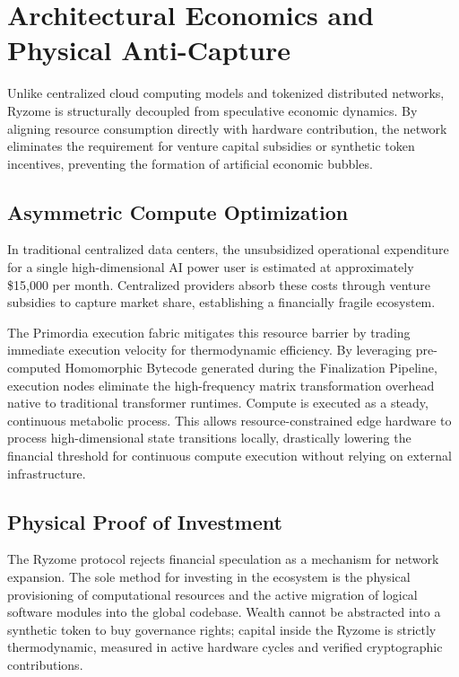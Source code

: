 \documentclass{article}
\begin{document}
\section{Architectural Economics and Physical Anti-Capture}
Unlike centralized cloud computing models and tokenized distributed networks, Ryzome is structurally decoupled from speculative economic dynamics. By aligning resource consumption directly with hardware contribution, the network eliminates the requirement for venture capital subsidies or synthetic token incentives, preventing the formation of artificial economic bubbles.

\subsection{Asymmetric Compute Optimization}
In traditional centralized data centers, the unsubsidized operational expenditure for a single high-dimensional AI power user is estimated at approximately \$15,000 per month. Centralized providers absorb these costs through venture subsidies to capture market share, establishing a financially fragile ecosystem. 

The Primordia execution fabric mitigates this resource barrier by trading immediate execution velocity for thermodynamic efficiency. By leveraging pre-computed Homomorphic Bytecode generated during the Finalization Pipeline, execution nodes eliminate the high-frequency matrix transformation overhead native to traditional transformer runtimes. Compute is executed as a steady, continuous metabolic process. This allows resource-constrained edge hardware to process high-dimensional state transitions locally, drastically lowering the financial threshold for continuous compute execution without relying on external infrastructure.

\subsection{Physical Proof of Investment}
The Ryzome protocol rejects financial speculation as a mechanism for network expansion. The sole method for investing in the ecosystem is the physical provisioning of computational resources and the active migration of logical software modules into the global codebase. Wealth cannot be abstracted into a synthetic token to buy governance rights; capital inside the Ryzome is strictly thermodynamic, measured in active hardware cycles and verified cryptographic contributions.
\end{document}

